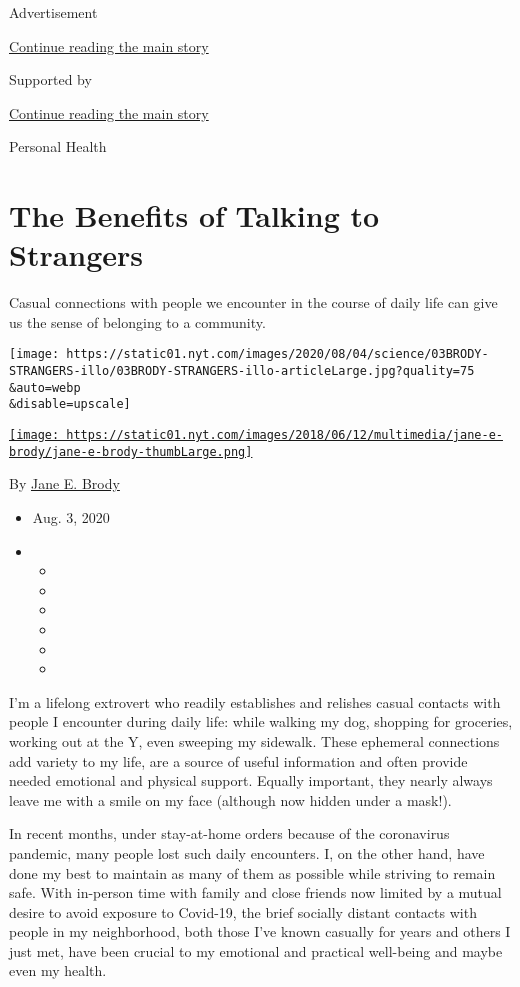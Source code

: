 Advertisement

\protect\hyperlink{after-top}{Continue reading the main story}

Supported by

\protect\hyperlink{after-sponsor}{Continue reading the main story}

Personal Health

\hypertarget{the-benefits-of-talking-to-strangers}{%
\section{The Benefits of Talking to
Strangers}\label{the-benefits-of-talking-to-strangers}}

Casual connections with people we encounter in the course of daily life
can give us the sense of belonging to a community.

\texttt{[image: https://static01.nyt.com/images/2020/08/04/science/03BRODY-STRANGERS-illo/03BRODY-STRANGERS-illo-articleLarge.jpg?quality=75\\\&auto=webp\\\&disable=upscale]}

\href{https://www.nytimes.com/by/jane-e-brody}{\texttt{[image: https://static01.nyt.com/images/2018/06/12/multimedia/jane-e-brody/jane-e-brody-thumbLarge.png]}}

By \href{https://www.nytimes.com/by/jane-e-brody}{Jane E. Brody}

\begin{itemize}
\item
  Aug. 3, 2020
\item
  \begin{itemize}
  \item
  \item
  \item
  \item
  \item
  \item
  \end{itemize}
\end{itemize}

I'm a lifelong extrovert who readily establishes and relishes casual
contacts with people I encounter during daily life: while walking my
dog, shopping for groceries, working out at the Y, even sweeping my
sidewalk. These ephemeral connections add variety to my life, are a
source of useful information and often provide needed emotional and
physical support. Equally important, they nearly always leave me with a
smile on my face (although now hidden under a mask!).

In recent months, under stay-at-home orders because of the coronavirus
pandemic, many people lost such daily encounters. I, on the other hand,
have done my best to maintain as many of them as possible while striving
to remain safe. With in-person time with family and close friends now
limited by a mutual desire to avoid exposure to Covid-19, the brief
socially distant contacts with people in my neighborhood, both those
I've known casually for years and others I just met, have been crucial
to my emotional and practical well-being and maybe even my health.


